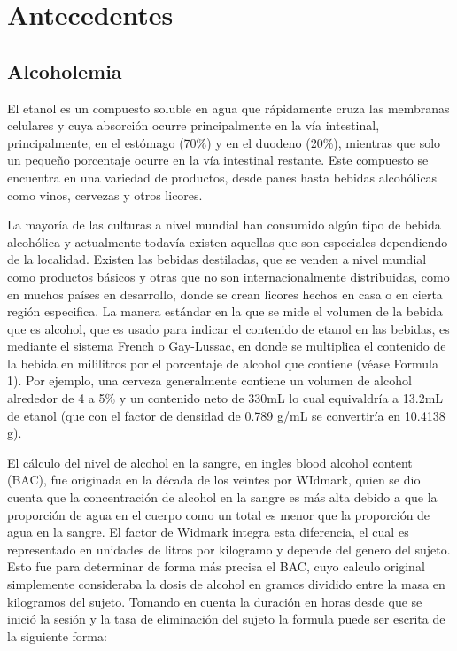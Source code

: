 \section{Antecedentes}
\subsection{Alcoholemia}
El etanol es un compuesto soluble en agua que rápidamente cruza las membranas celulares y cuya absorción ocurre principalmente en la vía intestinal, principalmente, en el estómago (70\%) y en el duodeno (20\%), mientras que solo un pequeño porcentaje ocurre en la vía intestinal restante. Este compuesto se encuentra en una variedad de productos, desde panes hasta bebidas alcohólicas como vinos, cervezas y otros licores. \cite{acute_alcohol} \par
La mayoría de las culturas a nivel mundial han consumido algún tipo de bebida alcohólica y actualmente todavía existen aquellas que son especiales dependiendo de la localidad. Existen las bebidas destiladas, que se venden a nivel mundial como productos básicos y otras que no son internacionalmente distribuidas, como en muchos países en desarrollo, donde se crean licores hechos en casa o en cierta región especifica. La manera estándar en la que se mide el volumen de la bebida que es alcohol, que es usado para indicar el contenido de etanol en las bebidas, es mediante el sistema French o Gay-Lussac, en donde se multiplica el contenido de la bebida en mililitros por el porcentaje de alcohol que contiene (véase Formula 1). Por ejemplo, una cerveza generalmente contiene un volumen de alcohol alrededor de 4 a 5\% y un contenido neto de 330mL lo cual equivaldría a 13.2mL de etanol (que con el factor de densidad de 0.789 g/mL se convertiría en 10.4138 g).\par
El cálculo del nivel de alcohol en la sangre, en ingles blood alcohol content (BAC), fue originada en la década de los veintes por WIdmark, quien se dio cuenta que la concentración de alcohol en la sangre es más alta debido a que la proporción de agua en el cuerpo como un total es menor que la proporción de agua en la sangre. El factor de Widmark integra esta diferencia, el cual es representado en unidades de litros por kilogramo y depende del genero del sujeto. Esto fue para determinar de forma más precisa el BAC, cuyo calculo original simplemente consideraba la dosis de alcohol en gramos dividido entre la masa en kilogramos del sujeto. Tomando en cuenta la duración en horas desde que se inició la sesión y la tasa de eliminación del sujeto la formula puede ser escrita de la siguiente forma:\par
